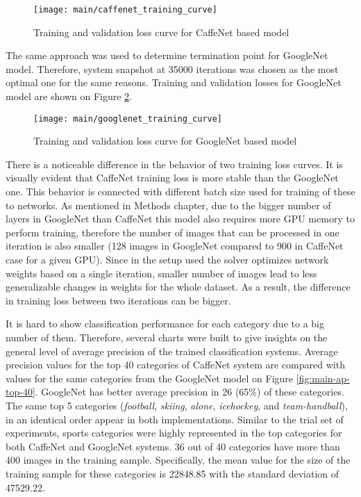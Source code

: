     \begin{figure}[H]
        \centering
        \texttt{[image: main/caffenet\_training\_curve]}
        \caption[Main experiment. Training and validation loss curve for CaffeNet based model]{Training and validation loss curve for CaffeNet based model}
        \label{fig:main-caffenet-training-curve}
    \end{figure}
    
    The same approach was used to determine termination point for GoogleNet model. Therefore, system snapshot at 35000 iterations was chosen as the most optimal one for the same reasons. Training and validation losses for GoogleNet model are shown on Figure \ref{fig:main-googlenet-training-curve}.
    
    \begin{figure}[H]
        \centering
        \texttt{[image: main/googlenet\_training\_curve]}
        \caption[Main experiment. Training and validation loss curve for GoogleNet based model]{Training and validation loss curve for GoogleNet based model}
        \label{fig:main-googlenet-training-curve}
    \end{figure}
    
    There is a noticeable difference in the behavior of two training loss curves. It is visually evident that CaffeNet training loss is more stable than the GoogleNet one. This behavior is connected with different batch size used for training of these to networks. As mentioned in Methods chapter, due to the bigger number of layers in GoogleNet than CaffeNet this model also requires more GPU memory to perform training, therefore the number of images that can be processed in one iteration is also smaller (128 images in GoogleNet compared to 900 in CaffeNet case for a given GPU). Since in the setup used the solver optimizes network weights based on a single iteration, smaller number of images lead to less generalizable changes in weights for the whole dataset. As a result, the difference in training loss between two iterations can be bigger.
    
    It is hard to show classification performance for each category due to a big number of them. Therefore, several charts were built to give insights on the general level of average precision of the trained classification systems. Average precision values for the top 40 categories of CaffeNet system are compared with values for the same categories from the GoogleNet model on Figure \ref{fig:main-ap-top-40}. GoogleNet has better average precision in 26 (65\%) of these categories. The same top 5 categories (\textit{football}, \textit{skiing}, \textit{alone}, \textit{icehockey}, and \textit{team-handball}), in an identical order appear in both implementations. Similar to the trial set of experiments, sports categories were highly represented in the top categories for both CaffeNet and GoogleNet systems. 36 out of 40 categories have more than 400 images in the training sample. Specifically, the mean value for the size of the training sample for these categories is 22848.85 with the standard deviation of 47529.22.
    

